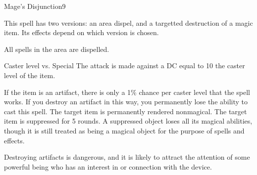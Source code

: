 \begin{spellsection}{Mage's Disjunction}{9}
\begin{spellheader}
\end{spellheader}
\begin{spellcontent}
    \begin{spelltargetinginfo}
        \spellspecial This spell has two versions: an area dispel, and a targetted destruction of a magic item. Its effects depend on which version is chosen.
    \end{spelltargetinginfo}
\end{spellcontent}
\begin{spellsubcontent}
    \begin{spelltargetinginfo}
    \end{spelltargetinginfo}
    \begin{spelleffects}
        \spelleffect All spells in the area are dispelled.
    \end{spelleffects}
\end{spellsubcontent}
\begin{spellsubcontent}
    \begin{spelltargetinginfo}
    \end{spelltargetinginfo}
    \begin{spelleffects}
        \begin{spellattack}{Caster level vs. Special}
            \spellspecial The attack is made against a DC equal to 10 \add the caster level of the item.

            If the item is an artifact, there is only a 1\% chance per caster level that the spell works. If you destroy an artifact in this way, you permanently lose the ability to cast this spell.
            \spellsuccess The target item is permanently rendered nonmagical.
            \spellfailure The target item is suppressed for 5 rounds. A suppressed object loses all its magical abilities, though it is still treated as being a magical object for the purpose of spells and effects.
        \end{spellattack}
    \end{spelleffects}
\end{spellsubcontent}
\begin{spellfooter}
    \spellnotes Destroying artifacts is dangerous, and it is likely to attract the attention of some powerful being who has an interest in or connection with the device.
\end{spellfooter}
\end{spellsection}


